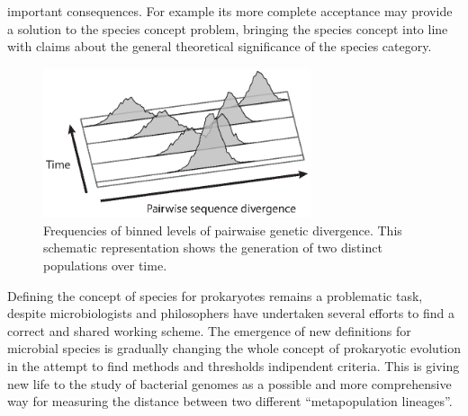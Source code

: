 important consequences. For example its more complete acceptance may provide a solution to the species concept problem, bringing the species concept into line with claims about the general theoretical significance of the species category.\\
\begin{figure}[!tb]
	\centering
	\includegraphics[width=0.7\textwidth]{./figures/Introduction/metapopulation}
  	\caption{Frequencies of binned levels of pairwaise genetic divergence. This schematic representation shows the generation of two distinct populations over time. \label{fig:metapop}}
\end{figure}
Defining the  concept of species for prokaryotes remains a problematic task, despite microbiologists and philosophers have undertaken several efforts to find a correct and shared working scheme. The emergence of new definitions for microbial species is gradually changing the whole concept of prokaryotic evolution in the attempt to find methods and thresholds indipendent criteria. This is giving new life to the study of bacterial genomes as a possible and more comprehensive way for measuring the distance between two different ``metapopulation lineages''.\\

